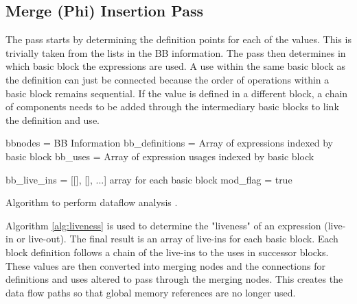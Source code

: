 \subsection{Merge (Phi) Insertion Pass}
The pass starts by determining the definition points for each of the values. This is trivially taken from the  lists in the BB information. The pass then determines in which basic block the expressions are used. A use within the same basic block as the definition can just be connected because the order of operations within a basic block remains sequential. If the value is defined in a different block, a chain of components needs to be added through the intermediary basic blocks to link the definition and use. 

\begin{algorithm}[h]
\SetAlgoLined
{}
	bbnodes = BB Information\;
	bb\_definitions = Array of expressions indexed by basic block\;
	bb\_uses = Array of expression usages indexed by basic block\;
	
	bb\_live\_ins = [[], [], ...] array for each basic block\;
 	mod\_flag = true\;

\caption{Algorithm to perform dataflow analysis \cite{liveness}.}
\label{alg:liveness}
\end{algorithm}

Algorithm \ref{alg:liveness} is used to determine the "liveness" of an expression (live-in or live-out). The final result is an array of live-ins for each basic block. Each block definition follows a chain of the live-ins to the uses in successor blocks. These values are then converted into merging nodes and the connections for definitions and uses altered to pass through the merging nodes.   This creates the data flow paths so that global memory references are no longer used.

